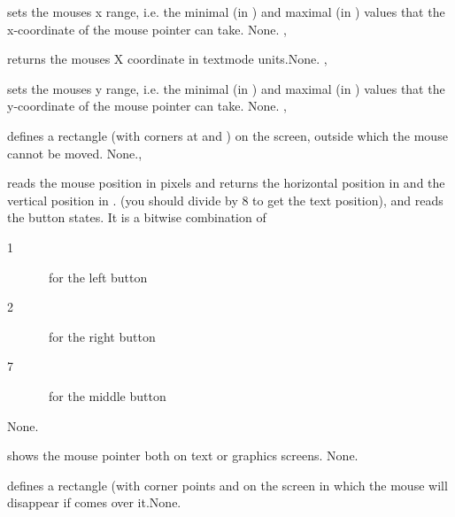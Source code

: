 { sets the mouses x range, i.e. the minimal (in
) and maximal (in ) values that the x-coordinate of the
mouse pointer can take.}
{None.}
{, }

{ returns the mouses X coordinate in textmode units.}{None.}
{, }

{ sets the mouses y range, i.e. the minimal (in
) and maximal (in ) values that the y-coordinate of the
mouse pointer can take.}
{None.}
{, }

{ defines a rectangle (with corners at  and
) on the screen, outside which the mouse cannot be moved.}
{None.}{, }


{ reads the mouse position in pixels and returns the
horizontal position in  and the vertical position in . 
(you should divide by 8 to get the text position), and reads the
  button states. It is a bitwise combination of 
\begin{description}
\item [1] \  for the left button
\item [2] \  for the right button
\item [7] \  for the middle button
\end{description}
}{None.}{}

{ shows the mouse pointer both on text or graphics screens.}
{None.}{}

{  defines a rectangle (with corner points 
and  on the screen in which the mouse will disappear if comes
over it.}{None.}{}



